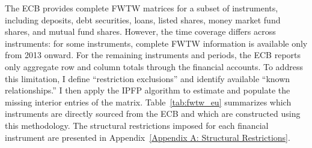 The ECB provides complete FWTW matrices for a subset of instruments, including deposits, debt securities, loans, listed shares, money market fund shares, and
mutual fund shares. However, the time coverage differs across instruments: for some instruments, complete FWTW information is available only from 2013 onward.
For the remaining instruments and periods, the ECB reports only aggregate row and column totals through the financial accounts. To address this limitation, I
define ``restriction exclusions'' and identify available ``known relationships.'' I then apply the IPFP algorithm to estimate and populate the missing interior
entries of the matrix. Table~\ref{tab:fwtw_eu} summarizes which instruments are directly sourced from the ECB and which are constructed using this methodology.
The structural restrictions imposed for each financial instrument are presented in Appendix~\ref{Appendix A: Structural Restrictions}.

